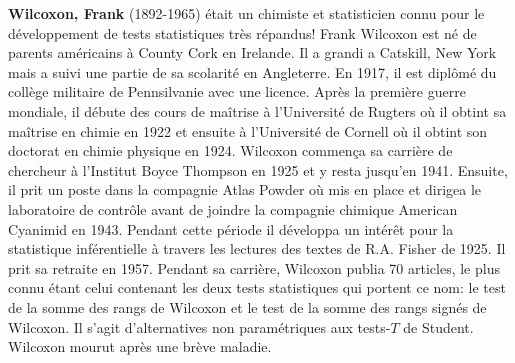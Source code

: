 \textbf{Wilcoxon, Frank} (1892-1965) était un chimiste et statisticien connu pour le développement de tests statistiques très répandus! Frank Wilcoxon est né de parents américains à County Cork en Irelande. Il a grandi a Catskill, New York mais a suivi une partie de sa scolarité en Angleterre. En 1917, il est diplômé du collège militaire de Pennsilvanie avec une licence. Après la première guerre mondiale, il débute des cours de maîtrise à l'Université de Rugters où il obtint sa maîtrise en chimie en 1922 et ensuite à l'Université de Cornell où il obtint son doctorat en chimie physique en 1924. Wilcoxon commença sa carrière de chercheur à l'Institut Boyce Thompson en 1925 et y resta jusqu'en 1941. Ensuite, il prit un poste dans la compagnie Atlas Powder où mis en place et dirigea le laboratoire de contrôle avant de joindre la compagnie chimique American Cyanimid en 1943. Pendant cette période il développa un intérêt pour la statistique inférentielle à travers les lectures des textes de R.A. Fisher de 1925. Il prit sa retraite en 1957. Pendant sa carrière, Wilcoxon publia 70 articles, le plus connu étant celui contenant les deux tests statistiques qui portent ce nom: le test de la somme des rangs de Wilcoxon et le test de la somme des rangs signés de Wilcoxon. Il s'agit d'alternatives non paramétriques aux tests-$T$ de Student. Wilcoxon mourut après une brève maladie.

